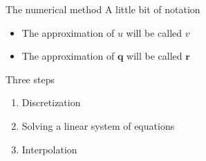\documentclass{beamer}
\begin{document}

    \begin{frame}{The numerical method}
        A little bit of notation
        \begin{itemize}
            \item The approximation of $u$ will be called $v$
            \item The approximation of $\bm{q}$ will be called $\bm{r}$
        \end{itemize}
        Three steps
        \begin{enumerate}
            \item Discretization
            \item Solving a linear system of equations
            \item Interpolation
        \end{enumerate}
    \end{frame}
\end{document}
